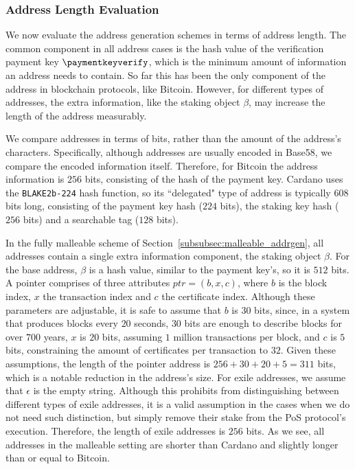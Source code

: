 \subsubsection{Address Length Evaluation}\label{sec:address-evaluation}

We now evaluate the address generation schemes in terms of address length. The
common component in all address cases is the hash value of the verification
payment key $\paymentkeyverify$, which is the minimum amount of information an
address needs to contain. So far this has been the only component of the
address in blockchain protocols, like Bitcoin. However, for different types of
addresses, the extra information, like the staking object $\beta$, may increase
the length of the address measurably.

We compare addresses in terms of bits, rather than the amount of the address's
characters. Specifically, although addresses are usually encoded in Base58, we
compare the encoded information itself. Therefore, for Bitcoin the address
information is $256$ bits, consisting of the hash of the payment key. Cardano
uses the \texttt{BLAKE2b-224} hash function, so its ``delegated" type of
address is typically $608$ bits long, consisting of the payment key hash ($224$
bits), the staking key hash ($256$ bits) and a searchable tag ($128$ bits).

In the fully malleable scheme of Section~\ref{subsubsec:malleable_addrgen}, all
addresses contain a single extra information component, the staking object
$\beta$. For the base address, $\beta$ is a hash value, similar to the payment
key's, so it is $512$ bits. A pointer comprises of three attributes $ptr = (b,
x, c)$, where $b$ is the block index, $x$ the transaction index and $c$ the
certificate index. Although these parameters are adjustable, it is safe to
assume that $b$ is $30$ bits, since, in a system that produces blocks every
$20$ seconds, $30$ bits are enough to describe blocks for over $700$ years, $x$
is $20$ bits, assuming $1$ million transactions per block, and $c$ is $5$ bits,
constraining the amount of certificates per transaction to $32$. Given these
assumptions, the length of the pointer address is $256 + 30 + 20 + 5 = 311$
bits, which is a notable reduction in the address's size. For exile addresses,
we assume that $\epsilon$ is the empty string. Although this prohibits from
distinguishing between different types of exile addresses, it is a valid
assumption in the cases when we do not need such distinction, but simply remove
their stake from the PoS protocol's execution. Therefore, the length of exile
addresses is $256$ bits. As we see, all addresses in the malleable setting are
shorter than Cardano and slightly longer than or equal to Bitcoin.

